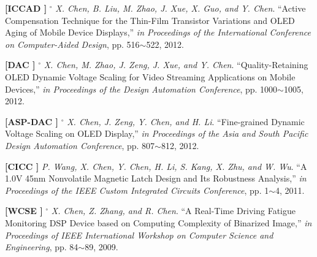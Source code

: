 	\textbf{[ICCAD ]}
	$^\circ$
	\textsl{X. Chen, B. Liu, M. Zhao, J. Xue, X. Guo, and Y. Chen}.
		``Active Compensation Technique for the Thin-Film Transistor Variations and OLED Aging of Mobile Device Displays,''
		\textsl{in Proceedings of the International Conference on Computer-Aided Design}, pp. 516$\sim$522, 2012.
			\vspace{-3mm}

	\textbf{[DAC ]}
	$^\circ$
	\textsl{X. Chen, M. Zhao, J. Zeng, J. Xue, and Y. Chen}.
		``Quality-Retaining OLED Dynamic Voltage Scaling for Video Streaming Applications on Mobile Devices,''
		\textsl{in Proceedings of the Design Automation Conference}, pp. 1000$\sim$1005, 2012.
			\vspace{-3mm}

	\textbf{[ASP-DAC ]}
	$^\circ$
	\textsl{X. Chen, J. Zeng, Y. Chen, and H. Li}.
		``Fine-grained Dynamic Voltage Scaling on OLED Display,''
		\textsl{in Proceedings of the Asia and South Pacific Design Automation Conference}, pp. 807$\sim$812, 2012.
			\vspace{-3mm}

	\textbf{[CICC ]}\hspace{2mm}
	\textsl{P. Wang, X. Chen, Y. Chen, H. Li, S. Kang, X. Zhu, and W. Wu}.
		``A 1.0V 45nm Nonvolatile Magnetic Latch Design and Its Robustness Analysis,''
		\textsl{in Proceedings of the IEEE Custom Integrated Circuits Conference}, pp. 1$\sim$4, 2011.
			\vspace{-3mm}

	\textbf{[WCSE ]}
	$^\circ$
	\textsl{X. Chen, Z. Zhang, and R. Chen}.
		``A Real-Time Driving Fatigue Monitoring DSP Device based on Computing Complexity of Binarized Image,''
		\textsl{in Proceedings of IEEE International Workshop on Computer Science and Engineering}, pp. 84$\sim$89, 2009.
			\vspace{-3mm}

			\vspace{3mm}





